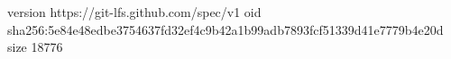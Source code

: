 version https://git-lfs.github.com/spec/v1
oid sha256:5e84e48edbe3754637fd32ef4c9b42a1b99adb7893fcf51339d41e7779b4e20d
size 18776
